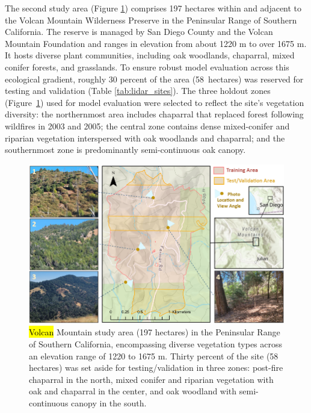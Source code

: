 \documentclass[remotesensing,article,accept,pdftex,moreauthors]{Definitions/mdpi}
\begin{document}
The second study area (Figure \ref{fig:volcan_mtn_study_area}) comprises 197 hectares within and adjacent to the Volcan Mountain Wilderness Preserve in the Peninsular Range of Southern California. The reserve is managed by San Diego County and the Volcan Mountain Foundation and ranges in elevation from about 1220 m to over 1675 m.
 It hosts diverse plant communities, including oak woodlands, chaparral, mixed conifer forests, and grasslands. To ensure robust model evaluation across this ecological gradient, roughly 30 percent of the area \mbox{(58 hectares)} was reserved for testing and validation (Table \ref{tab:lidar_sites}). The three holdout zones \mbox{(Figure \ref{fig:volcan_mtn_study_area})} used for model evaluation were selected to reflect the site’s vegetation diversity: the northernmost area includes chaparral that replaced forest following wildfires in 2003 and 2005; the central zone contains dense mixed-conifer and riparian vegetation interspersed with oak woodlands and chaparral; and the southernmost zone is predominantly semi-continuous oak canopy.


\begin{figure}[H]

    \includegraphics[width=0.98\linewidth]{figures/Volcan_Mtn_Study_Area.png}
    \caption{\hl{Volcan} %
 Mountain study area (197 hectares) in the Peninsular Range of Southern California, encompassing diverse vegetation types across an elevation range of 1220 to 1675 m. Thirty percent of the site (58 hectares) was set aside for testing/validation in three zones: post-fire chaparral in the north, mixed conifer and riparian vegetation with oak and chaparral in the center, and oak woodland with semi-continuous canopy in the south. }
    \label{fig:volcan_mtn_study_area}
\end{figure}
\end{document}
